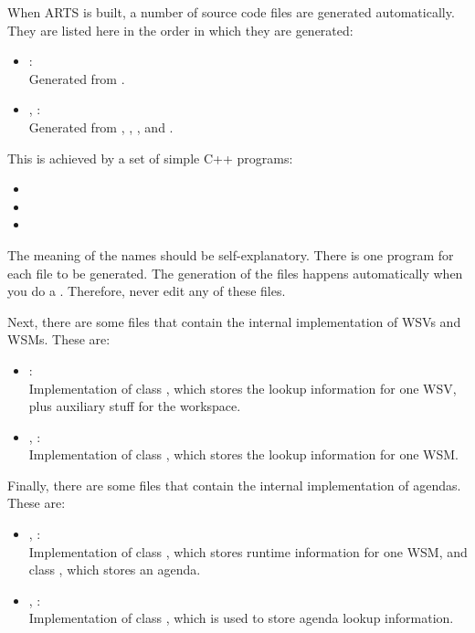 \vspace{2ex}
When ARTS is built, a number of source code files are generated
automatically. They are listed here in the order in which they are
generated: 
\begin{itemize}
\item {}:\\
  Generated from .
\item {}, :\\
  Generated from ,
  , , and .
\end{itemize}
This is achieved by a set of simple C++ programs:
\begin{itemize}
\item {}
\item {}
\item {}
\end{itemize}
The meaning of the names should be self-explanatory. There is one program
for each file to be generated.  The generation of the
 files happens automatically when you do a
. Therefore, never edit any of these files.

Next, there are some files that contain the internal implementation
of WSVs and WSMs. These are:
\begin{itemize}
\item {}:\\
  Implementation of class
  , which stores the lookup information for one
  WSV, plus auxiliary stuff for the workspace.
\item {}, :\\
  Implementation of class , which stores the
  lookup information for one WSM.
\end{itemize}

Finally, there are some files that contain the internal implementation
of agendas. These are:
\begin{itemize}
\item {}, :\\
  Implementation of class , which stores runtime
  information for one WSM, and class , which stores
  an agenda.
\item {}, :\\
  Implementation of class , which is used to store
  agenda lookup information.
\end{itemize}
  

